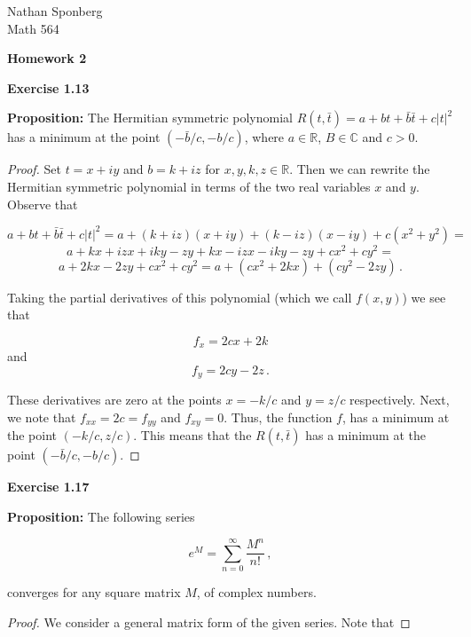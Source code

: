 \documentclass[a4paper]{article}
\numberwithin{equation}{section}
\begin{document}
\begin{flushright}
{\small{Nathan Sponberg\\}}
{\small{Math 564}}
\end{flushright}

\begin{center}
\bf{Homework 2}
\end{center}

\begin{description}

\item \textbf{Exercise 1.13}

\item \textbf{Proposition: }The Hermitian symmetric polynomial $R(t,\bar{t}) = a + bt + \bar{b}\bar{t} + c|t|^2$ has a minimum at the point $(-\bar{b}/c,-b/c)$, where $a \in \mathbb{R}$, $B \in \mathbb{C}$ and $c > 0$.

\begin{proof} Set $t = x+iy$ and $b = k + iz$ for $x,y,k,z \in \mathbb{R}$. Then we can rewrite the Hermitian symmetric polynomial in terms of the two real variables $x$ and $y$. Observe that 

$$a + bt + \bar{b}\bar{t} + c|t|^2 = a + (k + iz)(x + iy) + (k-iz)(x-iy) + c(x^2+y^2) = $$
$$a + kx + izx +iky - zy + kx - izx - iky - zy + cx^2 + cy^2 = $$
$$a + 2kx - 2zy + cx^2 + cy^2 = a + (cx^2 + 2kx) + (cy^2 - 2zy)\,.$$

Taking the partial derivatives of this polynomial (which we call $f(x,y)$) we see that

$$f_x = 2cx + 2k$$
and
$$f_y = 2cy - 2z\,.$$

These derivatives are zero at the points $x = -k/c$
and $y = z/c$ respectively. Next, we note that $f_{xx} = 2c = f_{yy}$ and $f_{xy} = 0$. Thus, the function $f$, has a minimum at the point $(-k/c,z/c)$. This means that the $R(t,\bar{t})$ has a minimum at the point $(-\bar{b}/c,-b/c)$.

\end{proof}

\item \textbf{Exercise 1.17}

\item \textbf{Proposition: }The following series

$$e^M = \sum_{n=0}^{\infty}\frac{M^n}{n!}\,,$$

converges for any square matrix $M$, of complex numbers.

\item \begin{proof}	We consider a general matrix form of the given series. Note that


\end{proof}
\end{description}
\end{document}
